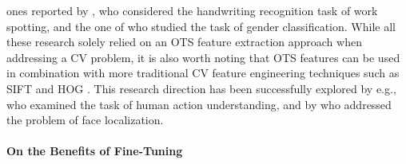 ones reported by \citet{sharma2015adapting}, who considered the handwriting recognition task of work spotting, and the one of \citet{van2015deep} who studied the task of gender classification. While all these research solely relied on an OTS feature extraction approach when addressing a CV problem, it is also worth noting that OTS features can be used in combination with more traditional CV feature engineering techniques such as SIFT \cite{lowe2004distinctive} and HOG \cite{dalal2005histograms}. This research direction has been successfully explored by e.g., \citet{wang2014action} who examined the task of human action understanding, and by \citet{zhong2016face} who addressed the problem of face localization.


\paragraph{On the Benefits of Fine-Tuning}
